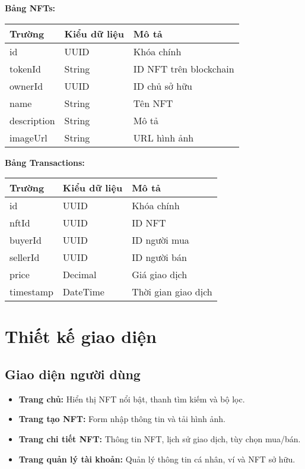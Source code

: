 \documentclass[a4paper,12pt]{report}
\begin{document}
\textbf{Bảng NFTs:}
\begin{center}
\begin{tabular}{|l|l|p{6cm}|}
    \hline
    \textbf{Trường} & \textbf{Kiểu dữ liệu} & \textbf{Mô tả} \\
    \hline
    id & UUID & Khóa chính \\
    \hline
    tokenId & String & ID NFT trên blockchain \\
    \hline
    ownerId & UUID & ID chủ sở hữu \\
    \hline
    name & String & Tên NFT \\
    \hline
    description & String & Mô tả \\
    \hline
    imageUrl & String & URL hình ảnh \\
    \hline
\end{tabular}
\end{center}

\textbf{Bảng Transactions:}
\begin{center}
\begin{tabular}{|l|l|p{6cm}|}
    \hline
    \textbf{Trường} & \textbf{Kiểu dữ liệu} & \textbf{Mô tả} \\
    \hline
    id & UUID & Khóa chính \\
    \hline
    nftId & UUID & ID NFT \\
    \hline
    buyerId & UUID & ID người mua \\
    \hline
    sellerId & UUID & ID người bán \\
    \hline
    price & Decimal & Giá giao dịch \\
    \hline
    timestamp & DateTime & Thời gian giao dịch \\
    \hline
\end{tabular}
\end{center}

\section{Thiết kế giao diện}

\subsection{Giao diện người dùng}
\begin{itemize}
    \item \textbf{Trang chủ:} Hiển thị NFT nổi bật, thanh tìm kiếm và bộ lọc.
    \item \textbf{Trang tạo NFT:} Form nhập thông tin và tải hình ảnh.
    \item \textbf{Trang chi tiết NFT:} Thông tin NFT, lịch sử giao dịch, tùy chọn mua/bán.
    \item \textbf{Trang quản lý tài khoản:} Quản lý thông tin cá nhân, ví và NFT sở hữu.
\end{itemize}
\end{document}
